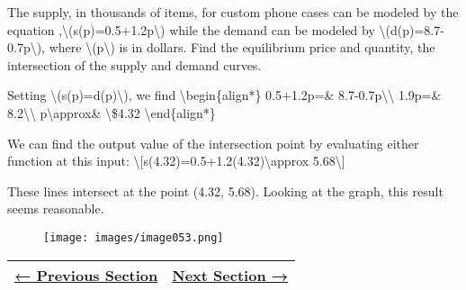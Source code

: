 The supply, in thousands of items, for custom phone cases can be modeled
by the equation ,\textbackslash{}(s(p)=0.5+1.2p\textbackslash{}) while
the demand can be modeled by
\textbackslash{}(d(p)=8.7-0.7p\textbackslash{}), where
\textbackslash{}(p\textbackslash{}) is in dollars. Find the equilibrium
price and quantity, the intersection of the supply and demand curves.

Setting \textbackslash{}(s(p)=d(p)\textbackslash{}), we find
\textbackslash{}begin\{align*\} 0.5+1.2p=\&
8.7-0.7p\textbackslash{}\textbackslash{} 1.9p=\&
8.2\textbackslash{}\textbackslash{} p\textbackslash{}approx\&
\textbackslash{}\$4.32 \textbackslash{}end\{align*\}

We can find the output value of the intersection point by evaluating
either function at this input:
\textbackslash{}{[}s(4.32)=0.5+1.2(4.32)\textbackslash{}approx
5.68\textbackslash{}{]}

These lines intersect at the point (4.32, 5.68). Looking at the graph,
this result seems reasonable.

\begin{figure}
\centering
\texttt{[image: images/image053.png]}
\caption{}
\end{figure}

\begin{longtable}[]{@{}ll@{}}
\toprule
\endhead
\href{section1-2.php}{← Previous Section} & \href{section1-4.php}{Next
Section →}\tabularnewline
\bottomrule
\end{longtable}
